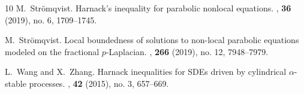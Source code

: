 \documentclass[11pt]{amsart}
\theoremstyle{plain}
\theoremstyle{definition}
\numberwithin{equation}{section}
\begin{document}
\begin{thebibliography}{10}
M.~Str\"{o}mqvist.
\newblock Harnack's inequality for parabolic nonlocal equations.
,
  \textbf{36} (2019), no. 6, 1709--1745.

M.~Str\"{o}mqvist.
\newblock Local boundedness of solutions to non-local parabolic equations
  modeled on the fractional {$p$}-{L}aplacian.
, \textbf{266} (2019), no. 12, 7948--7979.

L.~Wang and X.~Zhang.
\newblock Harnack inequalities for {SDE}s driven by cylindrical
  {$\alpha$}-stable processes.
, \textbf{42} (2015), no. 3, 657--669.
\end{thebibliography}
\end{document}
